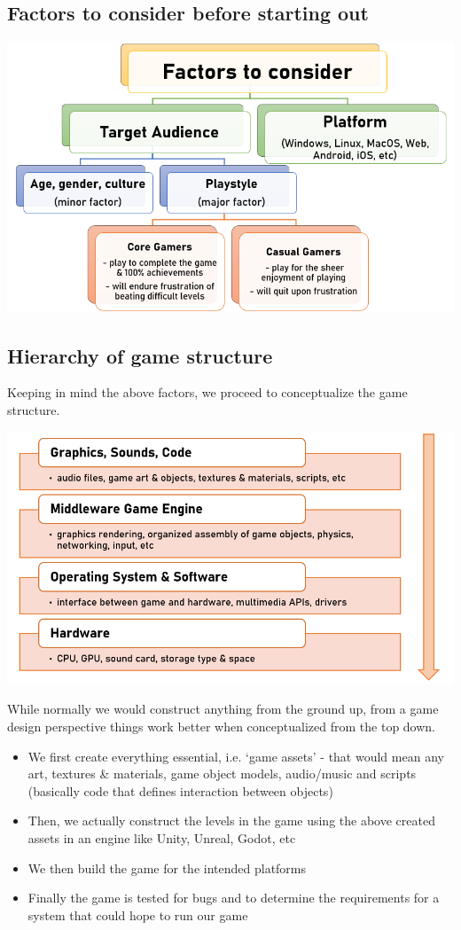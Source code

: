\documentclass{article}[a4paper,12pt]
\theoremstyle{definition}
\begin{document}
\subsection{Factors to consider before starting out}
\begin{center}\includegraphics[scale=0.8]{gamedev_basic_factors_to_consider.png}\end{center}

\subsection{Hierarchy of game structure}
Keeping in mind the above factors, we proceed to conceptualize the game structure.
\begin{center}\includegraphics[scale=0.8]{game_design_hierarchy.png}\end{center}

While normally we would construct anything from the ground up, from a game design perspective things work better when conceptualized from the top down. 
\begin{itemize}
	\item We first create everything essential, i.e. `game assets' - that would mean any art, textures \& materials, game object models, audio/music and scripts (basically code that defines interaction between objects)
	\item Then, we actually construct the levels in the game using the above created assets in an engine like Unity, Unreal, Godot, etc
	\item We then build the game for the intended platforms
	\item Finally the game is tested for bugs and to determine the requirements for a system that could hope to run our game
\end{itemize}
\end{document}
